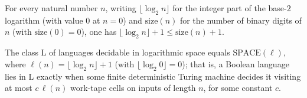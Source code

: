 \begin{lemma}
\label{Complexity.logSpace_le_size_succ}
\leanok
{}
For every natural number $n$, writing $\lfloor\log_2 n\rfloor$ for the integer part of the
base-$2$ logarithm (with value $0$ at $n=0$) and $\mathrm{size}(n)$ for the number of binary
digits of $n$ (with $\mathrm{size}(0)=0$), one has
$\lfloor\log_2 n\rfloor+1\le\mathrm{size}(n)+1$.
\end{lemma}

\begin{theorem}
\label{Complexity.LOGSPACE_eq}
\leanok
{}
The class $\mathrm{L}$ of languages decidable in logarithmic space equals
$\mathrm{SPACE}(\ell)$, where $\ell(n)=\lfloor\log_2 n\rfloor+1$ (with
$\lfloor\log_2 0\rfloor=0$); that is, a Boolean language lies in $\mathrm{L}$ exactly when
some finite deterministic Turing machine decides it visiting at most $c\,\ell(n)$ work-tape
cells on inputs of length $n$, for some constant $c$.
\end{theorem}
